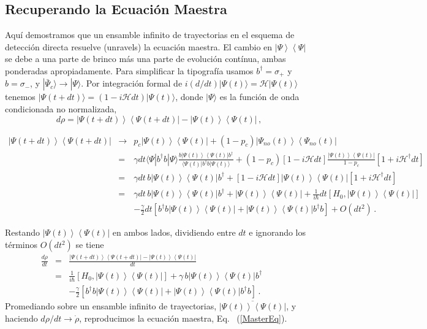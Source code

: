 \documentclass[twocolumn,aps,eqsecnum,showkeys,amsmath]{revtex4}
\newcommand{\mcH}{\mathcal{H}} 	%
\providecommand{\bra}[1]{\langle #1 \rvert}
\providecommand{\ket}[1]{\lvert #1 \rangle}
\newcommand{\ketbra}[2]{\left| {#1} \right\rangle\left\langle {#2}\right|}
\begin{document}
\subsection{Recuperando la Ecuaci\'on Maestra}
Aqu\'i demostramos que un ensamble infinito de trayectorias en el 
esquema de detecci\'on directa resuelve (unravels) la ecuaci\'on maestra. 
El cambio en $\ketbra{\Psi }{ \Psi}$ se debe a una parte de brinco m\'as 
una parte de evoluci\'on cont\'inua, ambas ponderadas apropiadamente. 
Para simplificar la tipograf\'ia usamos  $b^\dag =\sigma_+$ y 
$b= \sigma_-$, y $|\bar{\Psi}_c \rangle \to |\Psi \rangle$. Por integraci\'on 
formal de  $i(d/dt) \ket{\Psi(t)} = \mcH \ket{\Psi(t)}$ tenemos 
$\ket{\Psi(t+dt)} = (1 -i \mcH dt) \ket{\Psi(t)}$, donde $\ket{\Psi}$ es la 
funci\'on de onda condicionada no normalizada, 
%
\begin{equation}
d \rho = \ketbra{\Psi(t+dt) }{ \Psi(t+dt)} - \ketbra{\Psi(t) }{ \Psi(t)} 	\,,
\end{equation}
\begin{widetext}
%
\begin{eqnarray*}
\ketbra{\Psi(t+dt) }{ \Psi(t+dt)}  
	& \rightarrow &	p_c \ketbra{\Psi (t) }{ \Psi (t)} 	
	 +(1 -p_c) \ketbra{\Psi_{no}(t) }{ \Psi_{no}(t)} 	\\
&=& 	\gamma dt \langle \Psi |b^{\dag}b| \Psi \rangle 
	\frac{b \ketbra{\Psi(t) }{ \Psi(t)} b^\dag}
	{ \bra{\Psi(t)} b^\dag b \ket{\Psi(t)} }		
	 +(1 -p_c)[1 - i \mcH dt]	
	\frac{ \ketbra{\Psi (t) }{ \Psi (t)} }{1-p_c}  [1 +i \mcH^\dag dt]	\\
&=& 	\gamma dt  \,b \ketbra{\Psi(t) }{ \Psi(t)} b^\dag 		
	 +[1 - i \mcH dt]	 \ketbra{\Psi (t) }{ \Psi (t)}   [1 +i \mcH^\dag dt]	\\
&=& \gamma dt\, b \ketbra{\Psi (t) }{ \Psi (t)} b^\dag +\ketbra{\Psi (t) }{ \Psi (t)}  		 
	+\frac{1}{i\hbar} dt [H_0, \ketbra{\Psi (t) }{ \Psi (t)} ]	\\ 	
	 && -\frac{\gamma}{2} dt \left[ b^\dag b \ketbra{\Psi (t) }{ \Psi (t)} 	 
	 +\ketbra{\Psi (t) }{ \Psi (t)} b^\dag b \right] 	+O(dt^2)  \,.
\end{eqnarray*}
\end{widetext}
Restando $\ketbra{\Psi (t)}{ \Psi(t)}$ en ambos lados, dividiendo entre  $dt$  
e ignorando los t\'erminos $O(dt^2)$ se tiene 
%
\begin{eqnarray}
\frac{d \rho}{dt} &=& 
  \frac{ \ketbra{\Psi(t+dt) }{ \Psi(t+dt)} - \ketbra{\Psi (t) }{ \Psi (t)} }{dt}	
  \nonumber \\
	&=& \frac{1}{i\hbar} [H_0, \ketbra{\Psi (t) }{ \Psi (t)} ] 
	+\gamma \, b \ketbra{\Psi (t) }{ \Psi (t)} b^\dag	 	\nonumber\\ 
	&& -\frac{\gamma}{2} \left[ b^\dag b \ketbra{\Psi (t) }{ \Psi (t)} 
	+\ketbra{\Psi (t) }{ \Psi (t)} b^\dag b \right] 	  \,. \qquad 
\end{eqnarray}
Promediando sobre un ensamble infinito de trayectorias, 
$ \overline{ \ketbra{\Psi (t) }{ \Psi (t)} }$, y haciendo 
$d \rho /dt \to \dot{\rho}$, reproducimos la ecuaci\'on maestra, 
Eq.~ (\ref{MasterEq}). 
\end{document}
